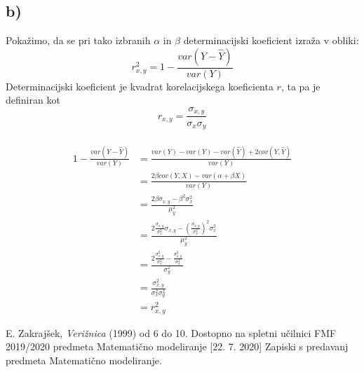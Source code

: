 \documentclass[A4paper, 11pt]{article}
\begin{document}
\subsection*{b)}
Pokažimo, da se pri tako izbranih $\alpha$ in $\beta$ determinacijski koeficient izraža v obliki:
\[ r_{x,y}^2 = 1 - \frac{var(Y - \hat{Y})}{var(Y)} \]
Determinacijski koeficient je kvadrat korelacijskega koeficienta $r$, ta pa je definiran kot
\[ r_{x,y} = \frac{\sigma_{x,y}}{\sigma_x \sigma_y} \]
\\
\[
\begin{split}
1 - \frac{var(Y - \hat{Y})}{var(Y)} & = \frac{var(Y) - var(Y) - var(\hat{Y}) + 2cov(Y,\hat{Y})}{var(Y)} \\
                                                        & = \frac{2 \beta cov(Y,X) - var(\alpha + \beta X)}{var(Y)} \\
                                                        & = \frac{2 \beta \sigma_{x,y} - \beta^2 \sigma_x^2}{\mu_y^2} \\
                                                        & = \frac{2 \frac{\sigma_{x,y}}{\sigma_x^2} \sigma_{x,y} - ( \frac{\sigma_{x,y}}{\sigma_x^2} )^2  \sigma_x^2}{\mu_y^2} \\
                                                        & = \frac{2 \frac{\sigma_{x,y}^2}{\sigma_x^2} -  \frac{\sigma_{x,y}^2}{\sigma_x^2}}{\sigma_y^2} \\
                                                        & = \frac{\sigma_{x,y}^2}{\sigma_x^2 \sigma_y^2} \\
                                                        & = r_{x,y}^2
\end{split}
\]


\begin{thebibliography}{9}
	E. Zakrajšek, \emph{Verižnica} (1999) od 6 do 10.
	Dostopno na spletni učilnici FMF 2019/2020 predmeta Matematično modeliranje [22. 7. 2020]
	Zapiski s predavanj predmeta Matematično modeliranje.
\end{thebibliography}
\end{document}
